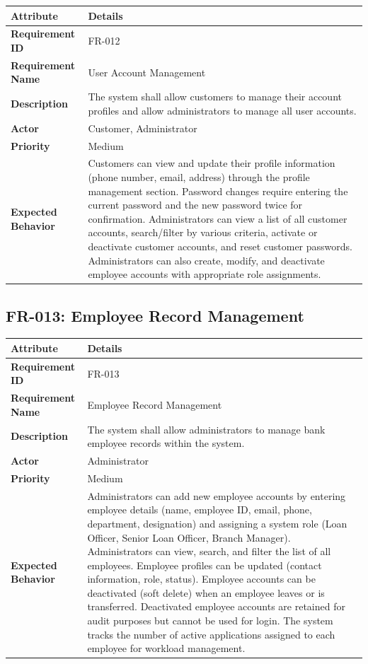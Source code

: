 \documentclass[12pt,a4paper,oneside]{report}
\begin{document}
\begin{table}[htbp]
\centering
\small
\begin{tabularx}{\textwidth}{l l}
\toprule
\textbf{Attribute} & \textbf{Details} \\
\midrule
\textbf{Requirement ID} & FR-012 \\
\textbf{Requirement Name} & User Account Management \\
\textbf{Description} & The system shall allow customers to manage their account profiles and allow administrators to manage all user accounts. \\
\textbf{Actor} & Customer, Administrator \\
\textbf{Priority} & Medium \\
\textbf{Expected Behavior} & Customers can view and update their profile information (phone number, email, address) through the profile management section. Password changes require entering the current password and the new password twice for confirmation. Administrators can view a list of all customer accounts, search/filter by various criteria, activate or deactivate customer accounts, and reset customer passwords. Administrators can also create, modify, and deactivate employee accounts with appropriate role assignments. \\
\bottomrule
\end{tabularx}
\end{table}

\subsection{FR-013: Employee Record Management}

\begin{table}[htbp]
\centering
\small
\begin{tabularx}{\textwidth}{l l}
\toprule
\textbf{Attribute} & \textbf{Details} \\
\midrule
\textbf{Requirement ID} & FR-013 \\
\textbf{Requirement Name} & Employee Record Management \\
\textbf{Description} & The system shall allow administrators to manage bank employee records within the system. \\
\textbf{Actor} & Administrator \\
\textbf{Priority} & Medium \\
\textbf{Expected Behavior} & Administrators can add new employee accounts by entering employee details (name, employee ID, email, phone, department, designation) and assigning a system role (Loan Officer, Senior Loan Officer, Branch Manager). Administrators can view, search, and filter the list of all employees. Employee profiles can be updated (contact information, role, status). Employee accounts can be deactivated (soft delete) when an employee leaves or is transferred. Deactivated employee accounts are retained for audit purposes but cannot be used for login. The system tracks the number of active applications assigned to each employee for workload management. \\
\bottomrule
\end{tabularx}
\end{table}
\end{document}

